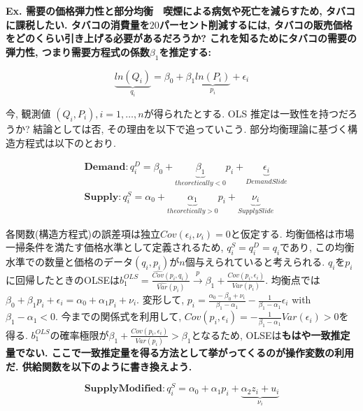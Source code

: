 \documentclass[paper=a4paper,fontsize=10pt]{jlreq}
\begin{document}
\rmfamily\mcfamily\bfseries{Ex. 需要の価格弾力性と部分均衡}\mdseries　喫煙による病気や死亡を減らすため, タバコに課税したい. タバコの消費量を$20$パーセント削減するには, タバコの販売価格をどのくらい引き上げる必要があるだろうか? これを知るためにタバコの需要の弾力性, つまり\rmfamily\mcfamily\bfseries{需要方程式}\mdseries の係数$\beta_1$を推定する:

\begin{equation*}
  \underset{q_i}{\underbrace{ln(Q_i)}} = \beta_0 + \beta_1 \underset{p_i}{\underbrace{ln(P_i)}} + \epsilon_i
\end{equation*}

今, 観測値 $(Q_i, P_i), i = 1,\dots,n$が得られたとする. OLS 推定は一致性を持つだろうか? 結論としては否, その理由を以下で追っていこう. 部分均衡理論に基づく構造方程式は以下のとおり.

\begin{align*}
  &\mathbf{Demand}:　q_i^D = \beta_0 + \underset{theoretically <0}{\underbrace{\beta_1}} p_i + \underset{Demand Slide}{\underbrace{\epsilon_i}}\\
  &\mathbf{Supply}:　　q_i^S = \alpha_0 + \underset{theoretically >0}{\underbrace{\alpha_1}} p_i + \underset{Supply Slide}{\underbrace{\nu_i}}
\end{align*}

各関数(構造方程式)の誤差項は独立$Cov(\epsilon_i, \nu_i)=0$と仮定する. 均衡価格は市場一掃条件を満たす価格水準として定義されるため, $q_i^S=q_i^D=q_i$であり, この均衡水準での数量と価格のデータ$(q_i, p_i)$が$n$個与えられていると考えられる. $q_i$を$p_i$に回帰したときのOLSEは$b_1^{OLS}=\frac{\hat{Cov}(p_i, q_i)}{\hat{Var}(p_i)} \overset{p}{\to} \beta_1 + \frac{{Cov}(p_i, \epsilon_i)}{{Var}(p_i)}$. 均衡点では$\beta_0 + \beta_1 p_i + \epsilon_i = \alpha_0 + \alpha_1 p_i + \nu_i$. 変形して, $p_i = \frac{\alpha_0 - \beta_0 + \nu_i}{\beta_1 - \alpha_1} - \frac{1}{\beta_1 - \alpha_1}\epsilon_i$ with $\beta_1 - \alpha_1 <0$. 今までの関係式を利用して, $Cov(p_i, \epsilon_i) = -\frac{1}{\beta_1 - \alpha_1}Var(\epsilon_i) > 0$を得る. $b_1^{OLS}$の確率極限が$\beta_1 + \frac{{Cov}(p_i, \epsilon_i)}{{Var}(p_i)} > \beta_1$となるため, OLSEは\rmfamily\mcfamily\bfseries{もはや一致推定量でない}\mdseries . ここで一致推定量を得る方法として挙がってくるのが\rmfamily\mcfamily\bfseries{操作変数}\mdseries の利用だ. 供給関数を以下のように書き換えよう.

\begin{equation*}
  \mathbf{SupplyModified}:　　q_i^S = \alpha_0 + \alpha_1 p_i + \underset{\nu_i}{\underbrace{\alpha_2 z_i + u_i}}
\end{equation*}
\end{document}
